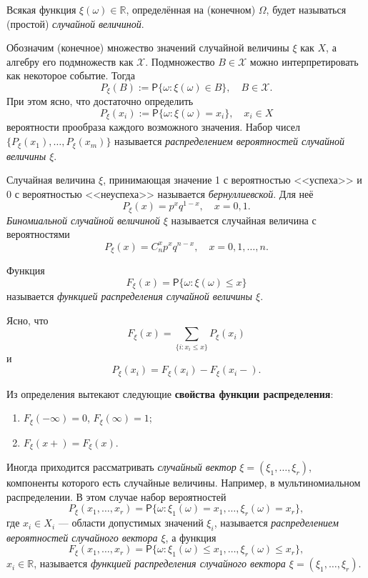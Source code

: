 \begin{definition}
Всякая функция $ \xi(\omega) \in \mathbb R $, определённая на (конечном) $ \Omega $, будет
называться (простой) \emph{случайной величиной}.
\end{definition}

Обозначим (конечное) множество значений случайной величины $ \xi $ как $ X $, а
алгебру его подмножеств как $ \mathscr X $. Подмножество $ B \in \mathscr X $
можно интерпретировать как некоторое событие. Тогда	 
\[
	P_\xi (B) := \mathsf P\{\omega \colon \xi(\omega) \in B\}, \quad B \in \mathscr
	X. 
\]
\sloppy При этом ясно, что достаточно определить 
\[
	P_\xi(x_i) := \mathsf P \{\omega \colon \xi(\omega) = x_i\}, \quad x_i \in X
\]
вероятности прообраза каждого возможного значения.
Набор чисел $ \{ P_\xi(x_1), \ldots, P_\xi(x_m)\} $ называется
\emph{распределением вероятностей случайной величины $ \xi $}.

\begin{ex}
	Случайная величина $ \xi $, принимающая значение 1 с вероятностью <<успеха>> и
	0 с вероятностью <<неуспеха>> называется \emph{бернуллиевской}. Для неё 
	\[
		P_\xi(x) = p^xq^{1-x}, \quad x=0,1.
	\]
	\emph{Биномиальной случайной величиной $ \xi $} называется случайная величина с вероятностями 
	\[
		P_\xi(x) = C^x_np^xq^{n-x}, \quad x = 0, 1, \ldots, n.
	\]
\end{ex}

\begin{definition}
	Функция  
	\[
		F_\xi(x)=\mathsf P\{\omega\colon\xi(\omega)\leqslant x\}
	\]
	называется \emph{функцией распределения случайной величины $ \xi $}.
\end{definition}

Ясно, что 
\[
	F_\xi(x) = \sum_{\{i\colon x_i \leqslant x\}} P_\xi(x_i)
\]
и 
\[
		P_\xi(x_i) = F_\xi(x_i) - F_\xi(x_i-).
\]

Из определения вытекают следующие \textbf{свойства функции распределения}:
\begin{enumerate}
	\item $ F_\xi(-\infty) = 0 $, $ F_\xi(\infty) = 1 $;
	\item $ F_\xi(x+)=F_\xi(x) $.
\end{enumerate}

Иногда приходится рассматривать \emph{случайный вектор} $ \xi = (\xi_1, \ldots,
\xi_r)$, компоненты которого есть случайные величины. Например, в
мультиномиальном распределении. В этом случае набор вероятностей 
\[
		P_\xi(x_1, \ldots, x_r) = \mathsf P\{\omega\colon \xi_1(\omega) = x_1,
		\ldots, \xi_r(\omega)=x_r\},
\]
где $ x_i \in X_i $ --- области допустимых значений $ \xi_i $, называется
\emph{распределением вероятностей случайного вектора $ \xi $}, а функция 
\[
		F_\xi(x_1, \ldots, x_r) = \mathsf P\{\omega\colon \xi_1(\omega)\leqslant
		x_1, \ldots, \xi_r(\omega) \leqslant x_r\},
\]
$ x_i \in \mathbb R $, называется \emph{функцией распределения случайного
вектора $ \xi = (\xi_1, \ldots, \xi_r) $}.

